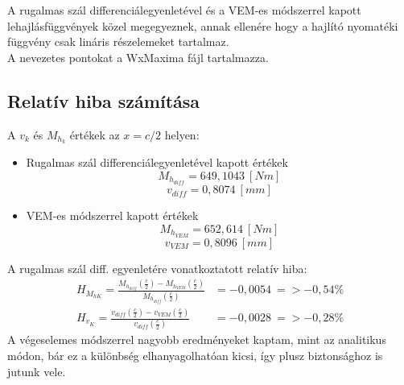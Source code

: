 \documentclass{article}
\begin{document}
		A rugalmas szál differenciálegyenletével és a VEM-es módszerrel kapott lehajlásfüggvények közel megegyeznek, annak ellenére hogy a hajlító nyomatéki függvény csak lináris részelemeket tartalmaz.\\[10pt]
		A nevezetes pontokat a WxMaxima fájl tartalmazza.
	\subsection{Relatív hiba számítása}	
		A $v_k$ és $M_{h_k}$ értékek az $x=c/2$ helyen:
		\begin{itemize}
			\item Rugalmas szál differenciálegyenletével kapott értékek
			\begin{equation}
				M_{h_{diff}} = 649,1043~[Nm]
			\end{equation}
			\begin{equation}
				v_{diff} = 0,8074~[mm]
			\end{equation}
			\item VEM-es módszerrel kapott értékek
			\begin{equation}
				M_{h_{VEM}} = 652,614~[Nm]
			\end{equation}
			\begin{equation}
				v_{VEM} = 0,8096~[mm]
			\end{equation}
		\end{itemize}
		
		A rugalmas szál diff. egyenletére vonatkoztatott relatív hiba:
		\begin{align}
			H_{M_{hK}}=\frac{M_{h_{diff}}(\frac{c}{2})-M_{h_{VEM}}(\frac{c}{2})}{M_{h_{diff}}(\frac{c}{2})}&=-0,0054~=> -0,54 \%\\
			H_{v_K}=\frac{v_{diff}(\frac{c}{2})-v_{VEM}(\frac{c}{2})}{v_{diff}(\frac{c}{2})}&=-0,0028~=> -0,28\%
		\end{align}
		A végeselemes módszerrel nagyobb eredményeket kaptam, mint az analitikus módon, bár ez a különbség elhanyagolhatóan kicsi, így plusz biztonsághoz is jutunk vele.
\end{document}

